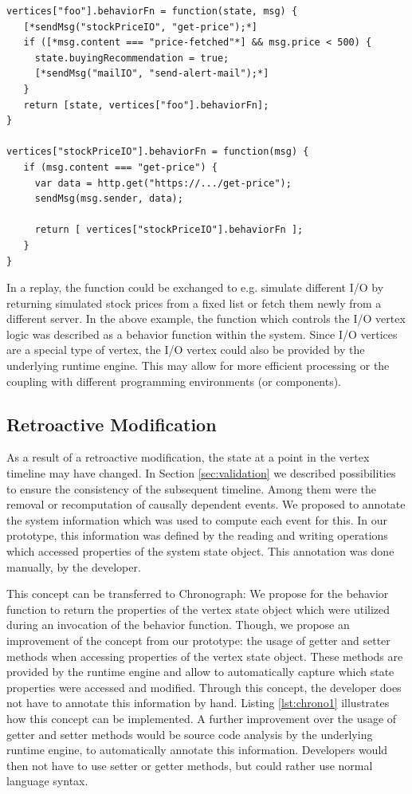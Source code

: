 \begin{lstlisting}[style=styled]
vertices["foo"].behaviorFn = function(state, msg) {
   [*sendMsg("stockPriceIO", "get-price");*]
   if ([*msg.content === "price-fetched"*] && msg.price < 500) {
     state.buyingRecommendation = true;
     [*sendMsg("mailIO", "send-alert-mail");*]
   }
   return [state, vertices["foo"].behaviorFn];
}
 
vertices["stockPriceIO"].behaviorFn = function(msg) {
   if (msg.content === "get-price") {
     var data = http.get("https://.../get-price");
     sendMsg(msg.sender, data);

     return [ vertices["stockPriceIO"].behaviorFn ];
   }
} 
\end{lstlisting}

In a replay, the  function could be exchanged to e.g. 
simulate different I/O by returning simulated stock prices from a fixed list
or fetch them newly from a different server.
In the above example, the function which controls the I/O vertex logic was
described as a behavior function within the system. Since I/O vertices 
are a special type of vertex, the I/O vertex could also be provided by 
the underlying runtime engine. This may allow for more efficient processing
or the coupling with different programming environments (or components).

\subsection{Retroactive Modification}
As a result of a retroactive modification, the state at a point in the vertex 
timeline may have changed. 
In Section \ref{sec:validation} we described possibilities to ensure the 
consistency of the subsequent timeline. Among them were the removal or 
recomputation of causally dependent events. We proposed to annotate the 
system information which was used to compute each event for this. In our 
prototype, this information was defined by the reading and writing operations 
which accessed properties of the system state object. This annotation was 
done manually, by the developer.

This concept can be transferred to Chronograph: We propose for the behavior
function to return the properties of the vertex state object which were
utilized during an invocation of the behavior function.
Though, we propose an improvement of the concept from our prototype: the usage 
of getter and setter methods when accessing properties of the vertex state 
object. These methods are provided by the runtime engine and allow to 
automatically capture which state properties were accessed and modified. 
Through this concept, the developer does not have to annotate this information 
by hand.
Listing \ref{lst:chrono1} illustrates how this concept can be implemented.
A further improvement over the usage of getter and setter methods would be
source code analysis by the underlying runtime engine, to automatically 
annotate this information. Developers would then not have to use setter or 
getter methods, but could rather use normal language syntax.

